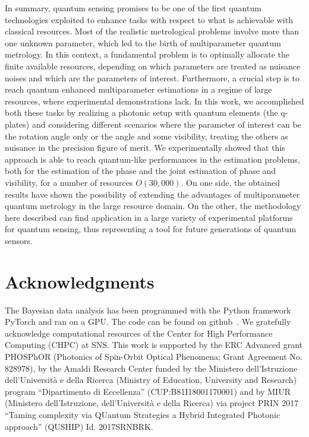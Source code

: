 \documentclass[aps,pra,twocolumn,notitlepage,superscriptaddress]{revtex4-1}
\begin{document}
In summary, quantum sensing promises to be one of the first quantum technologies exploited to enhance tasks with respect to what is achievable with classical resources. Most of the realistic metrological problems involve more than one unknown parameter, which led to the birth of multiparameter quantum metrology. In this context, a fundamental problem is to optimally allocate the finite available resources, depending on which parameters are treated as nuisance noises and which are the parameters of interest. Furthermore, a crucial step is to reach quantum enhanced multiparameter estimations in a regime of large resources, where experimental demonstrations lack. In this work, we accomplished both these tasks by realizing a photonic setup with quantum elements (the q-plates) and considering different scenarios where the parameter of interest can be the rotation angle only or the angle and some visibility, treating the others as nuisance in the precision figure of merit. We experimentally showed that this approach is able to reach quantum-like performances in the estimation problems, both for the estimation of the phase and the joint estimation of phase and visibility, for a number of resources $O(30,000)$. On one side, the obtained results have shown the possibility of extending the advantages of multiparameter quantum metrology in the large resource domain. On the other, the methodology here described can find application in a large variety of experimental platforms for quantum sensing, thus representing a tool for future generations of quantum sensors.
%
\section*{Acknowledgments}
The Bayesian data analysis has been programmed with the Python framework PyTorch and ran on a GPU. The code can be found on github~\cite{github}. We gratefully acknowledge computational resources of the Center for High Performance Computing (CHPC) at SNS. This work is supported by the ERC Advanced grant PHOSPhOR (Photonics of Spin-Orbit Optical Phenomena; Grant Agreement No. 828978), by the Amaldi Research Center funded by the Ministero dell'Istruzione dell'Universit\`a e della Ricerca (Ministry of Education, University and Research) program ``Dipartimento di Eccellenza'' (CUP:B81I18001170001) and by MIUR (Ministero dell’Istruzione, dell’Università e della Ricerca) via project PRIN 2017 “Taming complexity via QUantum Strategies a Hybrid Integrated Photonic approach” (QUSHIP) Id. 2017SRNBRK.

\vspace{4cm}

\end{document}

